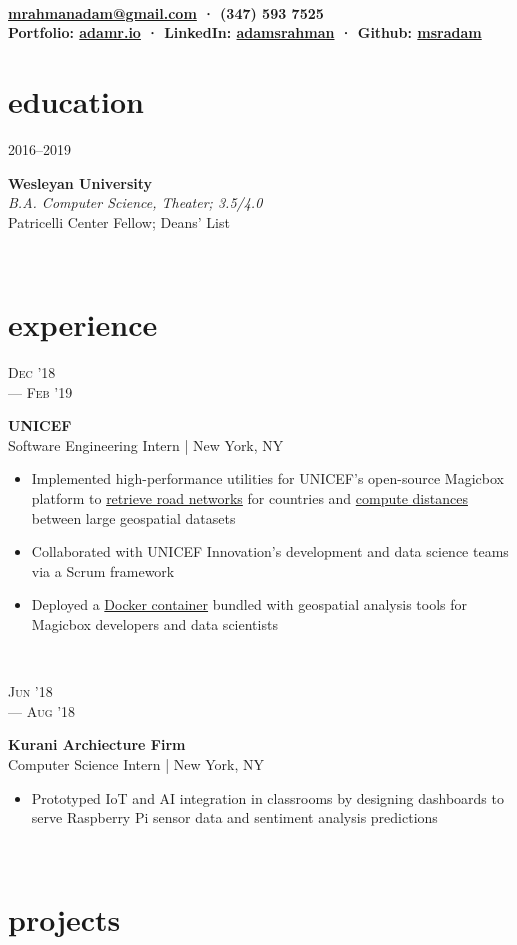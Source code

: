 \documentclass[letterpaper, 11pt]{article}
\author{Adam Rahman}
\makeatletter
\renewcommand{\maketitle}{
	\hspace{.125\textwidth}
	\begin{minipage}[t]{.75\textwidth}
    \begin{center}
        \fontsize{16pt}{15pt}\selectfont\bfseries \theauthor \\
        \fontsize{10pt}{15pt}\selectfont\sf
        \href{mailto:mrahmanadam@gmail.com}{mrahmanadam@gmail.com} · (347) 593 7525 \\
        Portfolio: \href{http://adamr.io}{adamr.io} · 
        LinkedIn: \href{https://www.linkedin.com/in/adamsrahman/}{adamsrahman} · 
        Github: \href{https://github.com/msradam}{msradam}  \\ 
        \end{center}
    \end{minipage}}
\newcommand{\eduentry}[4]{
    \begin{minipage}[t]{.15\linewidth}
    \hfill \textsc{#1}
    \end{minipage}
    \hfill\vline\hfill
    \begin{minipage}[t]{.80\linewidth}
    {\bf\large#2}
    \vspace{1pt}
    \\\textit{#3} \small{#4}
    \end{minipage}\\
    \vspace{.15cm}
    }
\newcommand{\expentry}[5]{
    \begin{minipage}[t]{.15\linewidth}
    \hfill \textsc{#1} \\
    \hfill \hspace*{5pt}\hfill --- \textsc{#2}
    \end{minipage}
    \hfill\vline\hfill
    \begin{minipage}[t]{.80\linewidth}
    {\bf\large#3}
    \\ #4 
    \vspace{-1.5mm}
    \small{#5}
    \end{minipage}\\
    \vspace{.15cm}
    }
\makeatother
\begin{document}
    \maketitle
    \vspace{.5cm}


    \section{education}
    \eduentry{2016--2019}
    {Wesleyan University}
    {B.A. Computer Science, Theater; 3.5/4.0}
    {\\ Patricelli Center Fellow; Deans' List}

    \section{experience}
    \expentry{Dec '18}
    {Feb '19}
    {UNICEF}
    {Software Engineering Intern | New York, NY}
    {

        \begin{itemize}{\leftmargin=0.5em \itemindent=0em}
          \setlength\itemsep{0.1mm}
          \item Implemented high-performance utilities for UNICEF's open-source Magicbox platform to \href{https://github.com/unicef/magicbox-download-roads}{retrieve road networks} for countries and \href{https://github.com/msradam/magicbox-site-routing}{compute distances} between large geospatial datasets 
          \item Collaborated with UNICEF Innovation's development and data science teams via a Scrum framework
          \item Deployed a \href{https://hub.docker.com/r/msradam/magicbox-tools}{Docker container} bundled with geospatial analysis tools for Magicbox developers and data scientists
        \end{itemize}
        
    }

    \expentry{Jun '18}
    {Aug '18}
    {Kurani Archiecture Firm}
    {Computer Science Intern | New York, NY}
    {\begin{itemize}
          \setlength\itemsep{0.1mm}
          \item Prototyped IoT and AI integration in classrooms by designing dashboards to serve Raspberry Pi sensor data and sentiment analysis predictions
        \end{itemize}
    }

    \section{projects}
\end{document}
